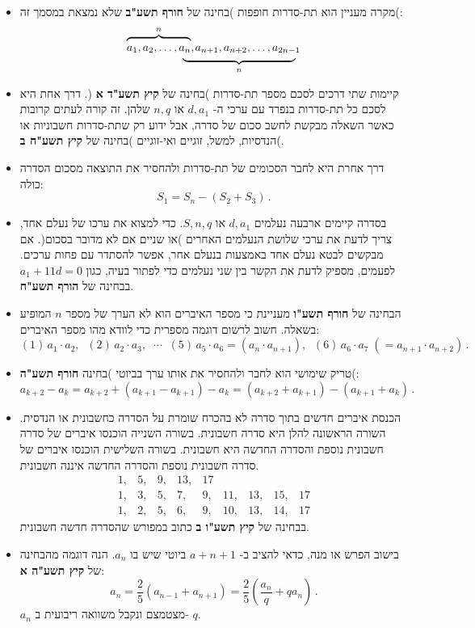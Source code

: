 \documentclass[12pt,a4paper]{article}
\begin{document}
\begin{itemize}
\item
מקרה מעניין הוא תת-סדרות חופפות )בחינה של 
\textbf{חורף תשע"ב}
שלא נמצאת במסמך זה(:
\[
\renewcommand{\arraystretch}{.4}
\begin{array}{ll}
\overbrace{\rule{0pt}{8pt}a_1, a_2, \ldots, a_n}^{n},&\hspace{-9pt}a_{n+1}, a_{n+2}, \ldots, a_{2n-1}\\
&\hspace{-2em}\underbrace{\rule{10em}{0pt}}_{n}
\end{array}
\]
\vspace{-4ex}
\item
קיימות שתי דרכים לסכם מספר תת-סדרות )בחינה של
\textbf{קיץ תשע"ד א}%
(. דרך אחת היא לסכם כל תת-סדרות בנפרד עם ערכי ה-%
$d, a_1$
או
$n, q$
שלהן. זה קורה לעתים קרובות כאשר השאלה מבקשת לחשב סכום של סדרה, אבל ידוע רק שתת-סדרות חשבוניות או הנדסיות, למשל, זוגיים ואי-זוגיים )בחינה של
\textbf{קיץ תשע"ח ב}(.
\item 
דרך אחרת היא לחבר הסכומים של תת-סדרות ולהחסיר את התוצאה מסכום הסדרה כולה:
\[
S_1 = S_n - (S_2+S_3)\,.
\]
\vspace{-6ex}

\item
בסדרה קיימים ארבעה נעלמים
$d, a_1$
או
$S, n, q$.
כדי למצוא את ערכו של נעלם אחד, צריך לדעת את ערכי שלושת הנעלמים האחרים )או שניים אם לא מדובר בסכום(. אם מבקשים לבטא נעלם אחד באמצעות בנעלם אחר, אפשר להסתדר עם פחות ערכים. לפעמים, מספיק לדעת את הקשר בין שני נעלמים כדי לפתור בעיה, כגון
$a_1+11d = 0$
בבחינה של
\textbf{הורף תשע"ח}.

\item
הבחינה של
\textbf{חורף תשע"ו}
מעניינת כי מספר האיברים הוא לא הערך של מספר 
$n$
המופיע בשאלה. חשוב לרשום דוגמה מספרית כדי לוודא מהו מספר האיברים:
\[
(1)\, a_1\cdot a_2,\;\; (2)\,a_2\cdot a_3,\;\;\cdots\;\; (5)\,a_5\cdot a_6=(a_n\cdot a_{n+1}),\;\; (6)\,a_6\cdot a_7 \;(= a_{n+1}\cdot a_{n+2})\,.
\]

\item
טריק שימושי הוא לחבר ולהחסיר את אותו ערך בביוטי )בחינה 
\textbf{חורף תשע"ה}(:
\[
a_{k+2} - a_{k} = a_{k+2}+(a_{k+1}-a_{k+1})-a_{k} = (a_{k+2}+a_{k+1})-(a_{k+1}+a_{k})\,.
\]

\item
הכנסת איברים חדשים בתוך סדרה לא בהכרח שומרת על הסדרה כחשבונית או הנדסית. השורה הראשונה להלן היא סדרה חשבונית. בשורה השנייה הוכנסו איברים של סדרה חשבונית נוספת והסדרה החדשה היא חשבונית. בשורה השלישית הוכנסו איברים של סדרה חשבונית נוספת והסדרה החדשה איננה חשבונית.
\[
\begin{array}{rrrrrrrrrrrrr}
1,& 5,& 9,& 13,& 17\\
1, &3,& 5,&7,& 9,& 11,& 13, &15, & 17\\
1, &2,& 5,&6,& 9,& 10,& 13, &14, & 17
\end{array}
\]
בבחינה של
\textbf{קיץ תשע"ו ב}
כתוב במפורש שהסדרה חדשה חשבונית.

\item
בישוב הפרש או מנה, כדאי להציב ב-%
$a+{n+1}$
ביוטי שיש בו 
$a_n$.
הנה דוגמה מהבחינה של 
\textbf{קיץ תשע"ה א}:
\[
a_n = \frac{2}{5}(a_{n-1}+a_{n+1}) =\frac{2}{5}\left(\frac{a_n}{q}+qa_n\right)\,.
\]
$a_n$
מצטמצם ונקבל משוואה ריבועית ב-%
$q$.

\end{itemize}
\end{document}
